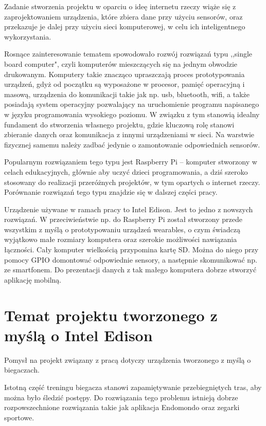 \documentclass[a4paper,twoside,titlepage,openright]{book}
\begin{document}
Zadanie stworzenia projektu w oparciu o ideę internetu rzeczy wiąże się z zaprojektowaniem urządzenia, które zbiera dane przy użyciu sensorów, oraz przekazuje je dalej przy użyciu sieci komputerowej, w celu ich inteligentnego wykorzystania.

Rosnące zainteresowanie tematem spowodowało rozwój rozwiązań typu ,,single board computer", czyli komputerów mieszczących się na jednym obwodzie drukowanym. Komputery takie znacząco upraszczają proces prototypowania urządzeń, gdyż od początku są wyposażone w procesor, pamięć operacyjną i masową, urządzenia do komunikacji takie jak np. usb, bluetooth, wifi, a także posiadają system operacyjny pozwalający na uruchomienie programu napisanego w języku programowania wysokiego poziomu. W związku z tym stanowią idealny fundament do stworzenia własnego projektu, gdzie kluczową rolę stanowi zbieranie danych oraz komunikacja z innymi urządzeniami w sieci. Na warstwie fizycznej samemu należy zadbać jedynie o zamontowanie odpowiednich sensorów.

Popularnym rozwiązaniem tego typu jest Raspberry Pi -- komputer stworzony w celach edukacyjnych, głównie aby uczyć dzieci programowania, a dziś szeroko stosowany do realizacji przeróżnych projektów, w tym opartych o internet rzeczy. Porównanie rozwiązań tego typu znajdzie się w dalszej części pracy.

Urządzenie używane w ramach pracy to Intel Edison. Jest to jedno z nowszych rozwiązań. W przeciwieństwie np. do Raspberry Pi został stworzony przede wszystkim z myślą o prototypowaniu urządzeń wearables, o czym świadczą wyjątkowo małe rozmiary komputera oraz szerokie możliwości nawiązania łączności. Cały komputer wielkością przypomina kartę SD. Można do niego przy pomocy GPIO domontować odpowiednie sensory, a następnie skomunikować np. ze smartfonem. Do prezentacji danych z tak małego komputera dobrze stworzyć aplikację mobilną.

\section*{Temat projektu tworzonego z myślą o Intel Edison}

Pomysł na projekt związany z pracą dotyczy urządzenia tworzonego z myślą o biegaczach. 

Istotną część treningu biegacza stanowi zapamiętywanie przebiegniętych tras, aby można było śledzić postępy. Do rozwiązania tego problemu istnieją dobrze rozpowszechnione rozwiązania takie jak aplikacja Endomondo oraz zegarki sportowe. 
\end{document}
